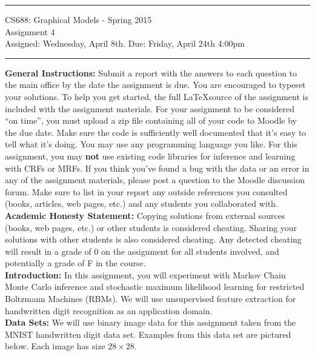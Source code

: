 \documentclass[11pt]{article}
\begin{document}
{\centering
  \rule{6.3in}{2pt}
  \vspace{1em}
  \Large{
    CS688: Graphical Models - Spring 2015\\
    Assignment 4\\
  }
  \vspace{1em}
  Assigned: Wednesday, April 8th. Due: Friday, April 24th 4:00pm\\
  \vspace{0.1em}
  \rule{6.3in}{1.5pt}
}
\vspace{1pc}

\textbf{General Instructions:} Submit a report with the answers to each question to the main office by the date the assignment is due. You are encouraged to typeset your solutions. To help you get started, the full \LaTeX source of the assignment is included with the assignment materials. For your assignment to be considered ``on time'', you must upload a zip file containing all of your code to Moodle by the due date. Make sure the code is sufficiently well documented that it's easy to tell what it's doing. You may use any programming language you like. For this assignment, you may \textbf{not} use existing code libraries for inference and learning with CRFs or MRFs. If you think you've found a bug with the data or an error in any of the assignment materials, please post a question to the Moodle discussion forum. Make sure to list in your report any outside references you consulted (books, articles, web pages, etc.) and any students you collaborated with.\\

\textbf{Academic Honesty Statement:} Copying solutions from external sources (books, web pages, etc.) or other students is considered cheating. Sharing your solutions with other students is also considered cheating. Any detected cheating will result in a grade of 0 on the assignment for all students involved, and potentially a grade of F in the course.\\

\textbf{Introduction:} In this assignment, you will experiment with Markov Chain Monte Carlo inference and stochastic maximum likelihood learning for restricted Boltzmann Machines (RBMs). We will use unsupervised feature extraction for handwritten digit recognition as an application domain.\\

\textbf{Data Sets:} We will use binary image data for this assignment taken from the MNIST handwritten digit data set. Examples from this data set are pictured below. Each image has size $28\times 28$.
\end{document}
